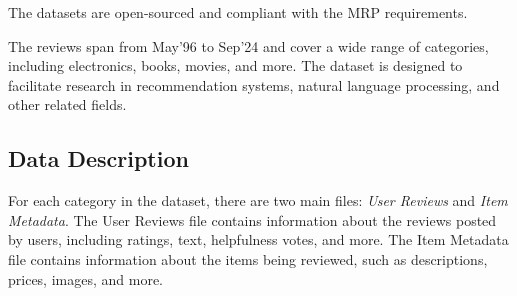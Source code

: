\documentclass{article}
\begin{document}
The datasets are open-sourced and compliant with the MRP requirements.

The reviews span from May'96 to Sep'24 and cover a wide range of categories,
including electronics, books, movies, and more. The dataset is designed to
facilitate research in recommendation systems, natural language processing, and
other related fields.

\subsection{Data Description}

For each category in the dataset, there are two main files: \textit{User
      Reviews} and \textit{Item Metadata}. The User Reviews file contains
information
about the reviews posted by users, including ratings, text, helpfulness votes,
and more. The Item Metadata file contains information about the items being
reviewed, such as descriptions, prices, images, and more.
\end{document}
